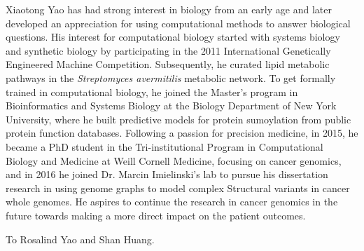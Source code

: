 \documentclass[phd,tocprelim]{cornell}
\begin{document}
\begin{biosketch}
    Xiaotong Yao has had strong interest in biology from an early age and later developed an appreciation for using computational methods to answer biological questions. His interest for computational biology started with systems biology and synthetic biology by participating in the 2011 International Genetically Engineered Machine Competition. Subsequently, he curated lipid metabolic pathways in the \textit{Streptomyces avermitilis} metabolic network. To get formally trained in computational biology, he joined the Master's program in Bioinformatics and Systems Biology at the Biology Department of New York University, where he built predictive models for protein sumoylation from public protein function databases. Following a passion for precision medicine, in 2015, he became a PhD student in the Tri-institutional Program in Computational Biology and Medicine at Weill Cornell Medicine, focusing on cancer genomics, and in 2016 he joined Dr. Marcin Imielinski's lab to pursue his dissertation research in using genome graphs to model complex Structural variants in cancer whole genomes. He aspires to continue the research in cancer genomics in the future towards making a more direct impact on the patient outcomes.
\end{biosketch}

\begin{dedication}
    To Rosalind Yao and Shan Huang.
\end{dedication}
\end{document}
